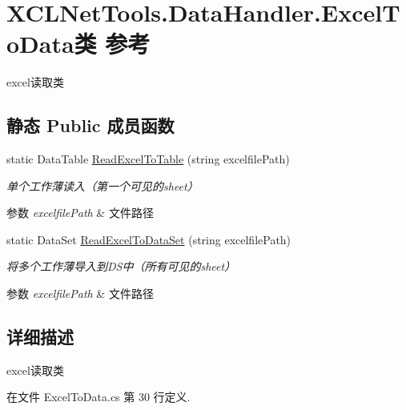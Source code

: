 \hypertarget{class_x_c_l_net_tools_1_1_data_handler_1_1_excel_to_data}{\section{X\-C\-L\-Net\-Tools.\-Data\-Handler.\-Excel\-To\-Data类 参考}
\label{class_x_c_l_net_tools_1_1_data_handler_1_1_excel_to_data}
}


excel读取类  


\subsection*{静态 Public 成员函数}
\begin{DoxyCompactItemize}
\item 
static Data\-Table \hyperlink{class_x_c_l_net_tools_1_1_data_handler_1_1_excel_to_data_adbc7d208ff0dbc770c7cf52d6a6f3673}{Read\-Excel\-To\-Table} (string excelfile\-Path)
\begin{DoxyCompactList}\small\item\em 单个工作薄读入（第一个可见的sheet） 
\begin{DoxyParams}{参数}
{\em excelfile\-Path} & 文件路径\\
\hline
\end{DoxyParams}
\end{DoxyCompactList}\item 
static Data\-Set \hyperlink{class_x_c_l_net_tools_1_1_data_handler_1_1_excel_to_data_ae7cfc36013815d61fbad11460386541f}{Read\-Excel\-To\-Data\-Set} (string excelfile\-Path)
\begin{DoxyCompactList}\small\item\em 将多个工作薄导入到\-D\-S中（所有可见的sheet） 
\begin{DoxyParams}{参数}
{\em excelfile\-Path} & 文件路径\\
\hline
\end{DoxyParams}
\end{DoxyCompactList}\end{DoxyCompactItemize}


\subsection{详细描述}
excel读取类 



在文件 Excel\-To\-Data.\-cs 第 30 行定义.



